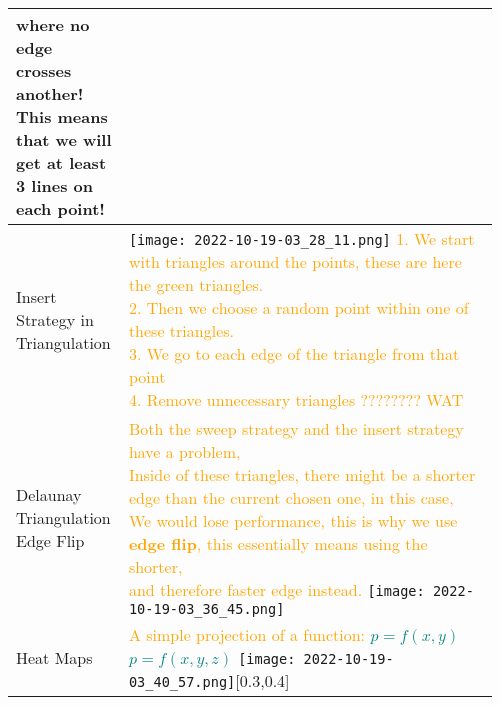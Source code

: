 \documentclass[main.tex,fontsize=8pt,paper=a4,paper=portrait,DIV=calc,]{scrartcl}
\begin{document}
\begin{table}[ht!]
\begin{tabular}{|m{0.2\linewidth}|m{0.755\linewidth}|}
{\textbf{where no edge crosses another!}\newline
This means that we will get at least 3 lines on each point!}\\
\hline
Insert Strategy \newline in Triangulation & 
\vspace{2mm}
\texttt{[image: 2022-10-19-03\_28\_11.png]}\newline
\textcolor{orange}{1. We start with triangles around the points, these are here the green triangles.\newline
2. Then we choose a random point within one of these triangles.\newline
3. We go to each edge of the triangle from that point\newline
4. Remove unnecessary triangles ???????? WAT}\\
\hline
Delaunay Triangulation \newline Edge Flip &
\textcolor{orange}{Both the sweep strategy and the insert strategy have a problem, \newline
Inside of these triangles, there might be a shorter edge than the current chosen one, in this case, \newline
We would lose performance, this is why we use \textbf{edge flip}, this essentially means using the shorter,\newline
and therefore faster edge instead.}\newline
\texttt{[image: 2022-10-19-03\_36\_45.png]}\\
\hline
Heat Maps & \minipg{
\textcolor{orange}{A simple projection of a function: }\newline
\huge \textcolor{teal}{\( p = f(x,y) \)}\newline
\huge \textcolor{teal}{\( p = f(x,y,z) \)}
\normalsize
}{
\texttt{[image: 2022-10-19-03\_40\_57.png]}}[0.3,0.4]\\ 
\hline
\end{tabular}
\end{table}
\pagebreak
\end{document}
